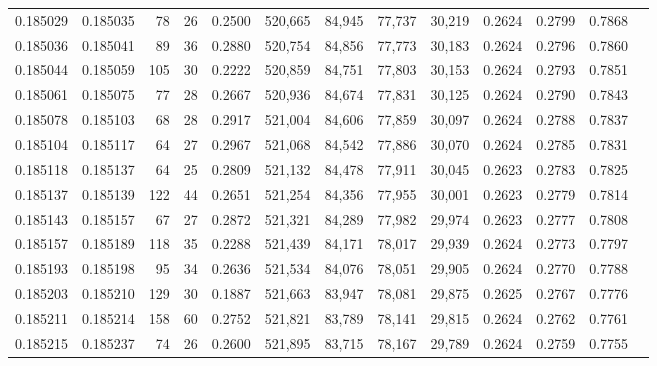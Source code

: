 \begin{tabular}{rrrrrrrrrrrrr}
0.185029 & 0.185035 &    78 &  26 &                                     0.2500 & 520,665 &  84,945 &  77,737 &  30,219 & 0.2624 & 0.2799 & 0.7868 \\
0.185036 & 0.185041 &    89 &  36 &                                     0.2880 & 520,754 &  84,856 &  77,773 &  30,183 & 0.2624 & 0.2796 & 0.7860 \\
0.185044 & 0.185059 &   105 &  30 &                                     0.2222 & 520,859 &  84,751 &  77,803 &  30,153 & 0.2624 & 0.2793 & 0.7851 \\
0.185061 & 0.185075 &    77 &  28 &                                     0.2667 & 520,936 &  84,674 &  77,831 &  30,125 & 0.2624 & 0.2790 & 0.7843 \\
0.185078 & 0.185103 &    68 &  28 &                                     0.2917 & 521,004 &  84,606 &  77,859 &  30,097 & 0.2624 & 0.2788 & 0.7837 \\
0.185104 & 0.185117 &    64 &  27 &                                     0.2967 & 521,068 &  84,542 &  77,886 &  30,070 & 0.2624 & 0.2785 & 0.7831 \\
0.185118 & 0.185137 &    64 &  25 &                                     0.2809 & 521,132 &  84,478 &  77,911 &  30,045 & 0.2623 & 0.2783 & 0.7825 \\
0.185137 & 0.185139 &   122 &  44 &                                     0.2651 & 521,254 &  84,356 &  77,955 &  30,001 & 0.2623 & 0.2779 & 0.7814 \\
0.185143 & 0.185157 &    67 &  27 &                                     0.2872 & 521,321 &  84,289 &  77,982 &  29,974 & 0.2623 & 0.2777 & 0.7808 \\
0.185157 & 0.185189 &   118 &  35 &                                     0.2288 & 521,439 &  84,171 &  78,017 &  29,939 & 0.2624 & 0.2773 & 0.7797 \\
0.185193 & 0.185198 &    95 &  34 &                                     0.2636 & 521,534 &  84,076 &  78,051 &  29,905 & 0.2624 & 0.2770 & 0.7788 \\
0.185203 & 0.185210 &   129 &  30 &                                     0.1887 & 521,663 &  83,947 &  78,081 &  29,875 & 0.2625 & 0.2767 & 0.7776 \\
0.185211 & 0.185214 &   158 &  60 &                                     0.2752 & 521,821 &  83,789 &  78,141 &  29,815 & 0.2624 & 0.2762 & 0.7761 \\
0.185215 & 0.185237 &    74 &  26 &                                     0.2600 & 521,895 &  83,715 &  78,167 &  29,789 & 0.2624 & 0.2759 & 0.7755 \\

\end{tabular}
